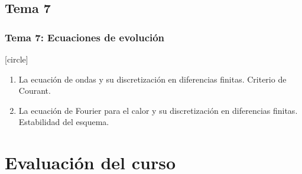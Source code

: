 \documentclass[12pt]{beamer}
\begin{document}
\subsection*{Tema 7}
\begin{frame}
\frametitle{\textbf{Tema 7: Ecuaciones de evolución}}
[circle]
\begin{enumerate}[<+->]
\item La ecuación de ondas y su discretización en diferencias finitas. Criterio de Courant.
\item La ecuación de Fourier para el calor y su discretización en diferencias finitas. Estabilidad del esquema.
\end{enumerate}
\end{frame}
\section{Evaluación del curso}
\end{document}
